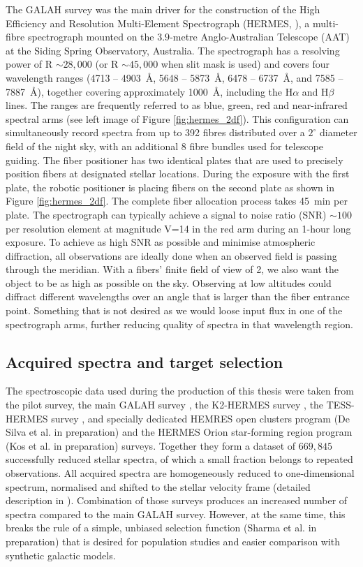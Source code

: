 The GALAH survey was the main driver for the construction of the High Efficiency and Resolution Multi-Element Spectrograph (HERMES, \cite{2010SPIE.7735E..09B, 2015JATIS...1c5002S}), a multi-fibre spectrograph mounted on the $3.9$-metre Anglo-Australian Telescope (AAT) at the Siding Spring Observatory, Australia. The spectrograph has a resolving power of R $\sim 28,000$ (or R $\sim 45,000$ when slit mask is used) and covers four wavelength ranges (4713 -- 4903~\AA, 5648 -- 5873~\AA, 6478 -- 6737~\AA, and 7585 -- 7887~\AA), together covering approximately 1000~\AA, including the H$\alpha$ and H$\beta$ lines. The ranges are frequently referred to as blue, green, red and near-infrared spectral arms (see left image of Figure \ref{fig:hermes_2df}). This configuration can simultaneously record spectra from up to 392 fibres distributed over a $2^\circ$ diameter field of the night sky, with an additional 8 fibre bundles used for telescope guiding. The fiber positioner has two identical plates that are used to precisely position fibers at designated stellar locations. During the exposure with the first plate, the robotic positioner is placing fibers on the second plate as shown in Figure \ref{fig:hermes_2df}. The complete fiber allocation process takes 45~min per plate. The spectrograph can typically achieve a signal to noise ratio (SNR) $\sim100$ per resolution element at magnitude V=14 in the red arm during an 1-hour long exposure. To achieve as high SNR as possible and minimise atmospheric diffraction, all observations are ideally done when an observed field is passing through the meridian. With a fibers' finite field of view of 2\arcsec, we also want the object to be as high as possible on the sky. Observing at low altitudes could diffract different wavelengths over an angle that is larger than the fiber entrance point. Something that is not desired as we would loose input flux in one of the spectrograph arms, further reducing quality of spectra in that wavelength region.

\subsection{Acquired spectra and target selection}
The spectroscopic data used during the production of this thesis were taken from the pilot survey, the main GALAH survey \cite{2015MNRAS.449.2604D}, the K2-HERMES survey \cite{2018AJ....155...84W}, the TESS-HERMES survey \cite{2018MNRAS.473.2004S}, and specially dedicated HEMRES open clusters program (De Silva et al. in preparation) and the HERMES Orion star-forming region program (Kos et al. in preparation) surveys. Together they form a dataset of $669,845$ successfully reduced stellar spectra, of which a small fraction belongs to repeated observations. All acquired spectra are homogeneously reduced to one-dimensional spectrum, normalised and shifted to the stellar velocity frame (detailed description in \citet{2017MNRAS.464.1259K}). Combination of those surveys produces an increased number of spectra compared to the main GALAH survey. However, at the same time, this breaks the rule of a simple, unbiased selection function (Sharma et al. in preparation) that is desired for population studies and easier comparison with synthetic galactic models.

